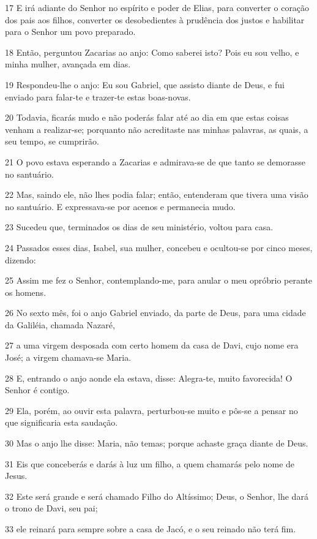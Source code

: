 \par 17 E irá adiante do Senhor no espírito e poder de Elias, para converter o coração dos pais aos filhos, converter os desobedientes à prudência dos justos e habilitar para o Senhor um povo preparado.
\par 18 Então, perguntou Zacarias ao anjo: Como saberei isto? Pois eu sou velho, e minha mulher, avançada em dias.
\par 19 Respondeu-lhe o anjo: Eu sou Gabriel, que assisto diante de Deus, e fui enviado para falar-te e trazer-te estas boas-novas.
\par 20 Todavia, ficarás mudo e não poderás falar até ao dia em que estas coisas venham a realizar-se; porquanto não acreditaste nas minhas palavras, as quais, a seu tempo, se cumprirão.
\par 21 O povo estava esperando a Zacarias e admirava-se de que tanto se demorasse no santuário.
\par 22 Mas, saindo ele, não lhes podia falar; então, entenderam que tivera uma visão no santuário. E expressava-se por acenos e permanecia mudo.
\par 23 Sucedeu que, terminados os dias de seu ministério, voltou para casa.
\par 24 Passados esses dias, Isabel, sua mulher, concebeu e ocultou-se por cinco meses, dizendo:
\par 25 Assim me fez o Senhor, contemplando-me, para anular o meu opróbrio perante os homens.
\par 26 No sexto mês, foi o anjo Gabriel enviado, da parte de Deus, para uma cidade da Galiléia, chamada Nazaré,
\par 27 a uma virgem desposada com certo homem da casa de Davi, cujo nome era José; a virgem chamava-se Maria.
\par 28 E, entrando o anjo aonde ela estava, disse: Alegra-te, muito favorecida! O Senhor é contigo.
\par 29 Ela, porém, ao ouvir esta palavra, perturbou-se muito e pôs-se a pensar no que significaria esta saudação.
\par 30 Mas o anjo lhe disse: Maria, não temas; porque achaste graça diante de Deus.
\par 31 Eis que conceberás e darás à luz um filho, a quem chamarás pelo nome de Jesus.
\par 32 Este será grande e será chamado Filho do Altíssimo; Deus, o Senhor, lhe dará o trono de Davi, seu pai;
\par 33 ele reinará para sempre sobre a casa de Jacó, e o seu reinado não terá fim.

